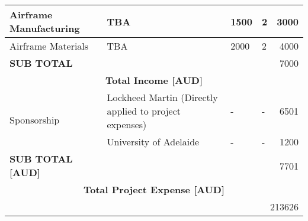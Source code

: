 \begin{table}[h]
{\begin{tabular}{|l|l|l|l|r|}
Airframe Manufacturing                             & TBA                                & 1500                                 & 2                             & 3000                                          \\ \hline
Airframe Materials                                  & TBA                                & 2000                                 & 2                             & 4000                                          \\ \hline
\textbf{SUB TOTAL}                                 & \multicolumn{4}{r|}{7000}                                                                                                                                 \\ \hline
\multicolumn{5}{|c|}{\textbf{Total Income {[}AUD{]}}}                                                                                                                                                          \\ \hline
\multirow{2}{*}{Sponsorship}                       & Lockheed Martin (Directly applied to project expenses)                    & -                                    & -                             & 6501                                          \\ \cline{2-5} 
                                                   & University of Adelaide             & -                                    & -                             & 1200                                          \\ \hline
\textbf{SUB TOTAL {[}AUD{]}}                                 & \multicolumn{4}{r|}{7701}                                                                                                                                 \\ \hline
\multicolumn{5}{|c|}{\textbf{Total Project Expense {[}AUD{]}}}                                                                                                                                                 \\ \hline
\multicolumn{5}{|r|}{213626}                                                                                                                                                                                   \\ \hline
\end{tabular}}
\end{table}
